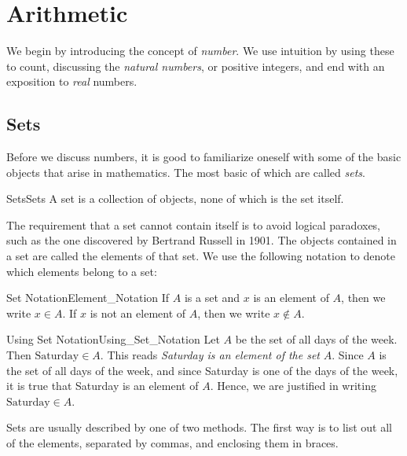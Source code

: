 \chapter{Arithmetic}
    We begin by introducing the concept of \textit{number}. We use
    intuition by using these to count, discussing the
    \textit{natural numbers}, or positive integers, and end with an
    exposition to \textit{real} numbers.
    \section{Sets}
        Before we discuss numbers, it is good to familiarize oneself
        with some of the basic objects that arise in mathematics. The
        most basic of which are called \textit{sets}.
        \begin{fdefinition}{Sets}{Sets}
            A set is a collection of objects, none of which
            is the set itself.
        \end{fdefinition}
        The requirement that a set cannot contain itself is to avoid
        logical paradoxes, such as the one discovered by Bertrand
        Russell in 1901. The objects contained in a set are called
        the elements of that set. We use the following notation to
        denote which elements belong to a set:
        \begin{fnotation}{Set Notation}{Element_Notation}
            If $A$ is a set and $x$ is an element of $A$, then we
            write $x\in{A}$. If $x$ is not an element of $A$, then
            we write $x\notin{A}$.
        \end{fnotation}
        \begin{lexample}{Using Set Notation}{Using_Set_Notation}
            Let $A$ be the set of all days of the week. Then
            $\textrm{Saturday}\in{A}$. This reads
            \textit{Saturday is an element of the set} $A$. Since
            $A$ is the set of all days of the week, and since
            Saturday is one of the days of the week, it is true that
            Saturday is an element of $A$. Hence, we are justified
            in writing $\textrm{Saturday}\in{A}$.
        \end{lexample}
        Sets are usually described by one of two methods. The first
        way is to list out all of the elements, separated by commas,
        and enclosing them in braces.
